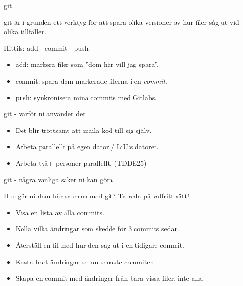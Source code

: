 \documentclass{beamer}
\begin{document}
  \begin{frame}{git}

    git är i grunden ett verktyg för att spara olika versioner av hur filer såg
    ut vid olika tillfällen.

    Hittils: add - commit - push.

    \pause{}

    \begin{itemize}[<+->]
      \item add: markera filer som ''dom här vill jag spara''.
      \item commit: spara dom markerade filerna i en \emph{commit}.
      \item push: synkronisera mina commits med Gitlabs.
    \end{itemize}

  \end{frame}

  \begin{frame}{git - varför ni använder det}

    \pause{}

    \begin{itemize}[<+->]
      \item Det blir tröttsamt att maila kod till sig själv.
      \item Arbeta parallellt på egen dator / LiU:s datorer.
      \item Arbeta två+ personer parallellt. (TDDE25)
    \end{itemize}

  \end{frame}

  \begin{frame}{git - några vanliga saker ni kan göra}

    Hur gör ni dom här sakerna med git? Ta reda på valfritt sätt!

    \begin{itemize}
      \item Visa en lista av alla commits.
      \item Kolla vilka ändringar som skedde för 3 commits sedan.
      \item Återställ en fil med hur den såg ut i en tidigare commit.
      \item Kasta bort ändringar sedan senaste commiten.
      \item Skapa en commit med ändringar från bara vissa filer, inte alla.
    \end{itemize}
  \end{frame}
\end{document}
